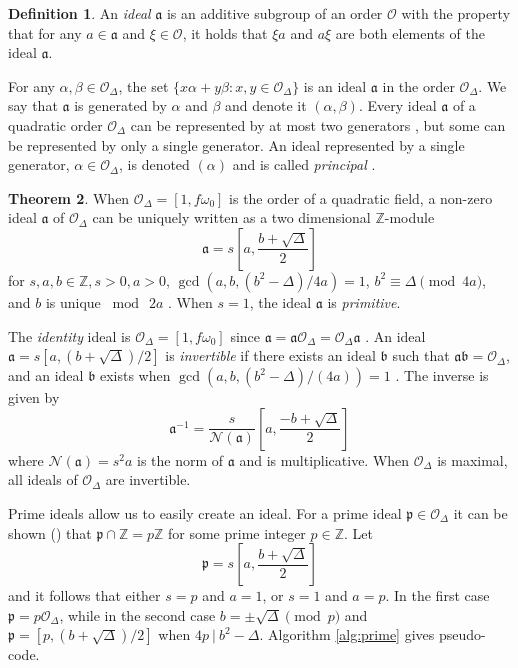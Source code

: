 \documentclass{ucalgthes1}
\theoremstyle{definition}
\newtheorem{thm}{Theorem}[section]
\newtheorem{defn}[thm]{Definition}
\newcommand{\OO}{\mathcal{O}}
\newcommand{\ZZ}{\mathbb{Z}}
\begin{document}
\begin{defn}
An \emph{ideal} $\mathfrak a$ is an additive subgroup of an order $\OO$ with the property that for any $a \in \mathfrak a$ and $\xi \in \OO$, it holds that $\xi a$ and $a \xi$ are both elements of the ideal $\mathfrak a$.
\end{defn}

For any $\alpha, \beta \in \OO_\Delta$, the set $\{x \alpha + y \beta : x, y \in \OO_\Delta\}$ is an ideal $\mathfrak a$ in the order $\OO_\Delta$.  We say that $\mathfrak a$ is generated by $\alpha$ and $\beta$ and denote it $(\alpha, \beta)$.  Every ideal $\mathfrak a$ of a quadratic order $\OO_\Delta$ can be represented by at most two generators \cite{Cohn1980}, but some can be represented by only a single generator.  An ideal represented by a single generator, $\alpha \in \OO_\Delta$, is denoted $(\alpha)$ and is called \emph{principal} \cite[p.87]{Jacobson2009}.

\begin{thm}
\label{thm:idealZModule}
When $\OO_\Delta = [1, f\omega_0]$ is the order of a quadratic field, a non-zero ideal $\mathfrak a$ of $\OO_\Delta$ can be uniquely written as a two dimensional $\ZZ$-module 
\[
	\mathfrak a = s\left[a, \frac{b+\sqrt{\Delta}}{2} \right]
\]
for $s, a, b \in \ZZ, s > 0, a > 0$, $\gcd(a, b, (b^2-\Delta)/4a)=1$, $b^2 \equiv \Delta \pmod{4a}$, and $b$ is unique $\bmod ~2a$ \cite[p.13]{Jacobson1999}. When $s = 1$, the ideal $\mathfrak a$ is \emph{primitive}.
\end{thm}

The \emph{identity} ideal is $\OO_\Delta = [1, f\omega_0]$ since $\mathfrak a = \mathfrak a \OO_\Delta = \OO_\Delta \mathfrak a$ \cite{Cohn1980}. An ideal $\mathfrak a = s[a, (b+\sqrt{\Delta})/2]$ is \emph{invertible} if there exists an ideal $\mathfrak b$ such that $\mathfrak a \mathfrak b = \OO_\Delta$, and an ideal $\mathfrak b$ exists when $\gcd(a, b, (b^2-\Delta)/(4a)) = 1$ \cite[p.14]{Jacobson1999}. The inverse is given by \cite[pp.14,15]{Jacobson1999}
\[
	{\mathfrak a}^{-1} = \frac{s}{\mathcal N(\mathfrak a)} \left[a, \frac{-b+\sqrt{\Delta}}{2} \right]
\]
where $\mathcal N(\mathfrak a) = s^2a$ is the norm of $\mathfrak a$ and is multiplicative. When $\OO_\Delta$ is maximal, all ideals of $\OO_\Delta$ are invertible. 

Prime ideals allow us to easily create an ideal.  For a prime ideal $\mathfrak p \in \OO_\Delta$ it can be shown (\cite[p.19]{Jacobson1999}) that $\mathfrak p \cap \ZZ = p\ZZ$ for some prime integer $p \in \ZZ$. Let
\[
	\mathfrak p = s\left[a, \frac{b + \sqrt{\Delta}}{2}\right]
\]
and it follows that either $s=p$ and $a=1$, or $s=1$ and $a=p$.  In the first case $\mathfrak p = p\OO_\Delta$, while in the second case $b = \pm \sqrt{\Delta} \pmod p$ and $\mathfrak p = [p, (b + \sqrt{\Delta})/2]$ when $4p ~|~ b^2 - \Delta$.  Algorithm \ref{alg:prime} gives pseudo-code.
\end{document}
